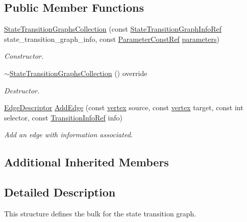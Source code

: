 \subsection*{Public Member Functions}
\begin{DoxyCompactItemize}
\item 
\hyperlink{classStateTransitionGraphsCollection_a1103b1504905684e153f0a746f8d85be}{State\+Transition\+Graphs\+Collection} (const \hyperlink{state__transition__graph_8hpp_ad14dd7263de4e0bad3ad431954ad8252}{State\+Transition\+Graph\+Info\+Ref} state\+\_\+transition\+\_\+graph\+\_\+info, const \hyperlink{Parameter_8hpp_a37841774a6fcb479b597fdf8955eb4ea}{Parameter\+Const\+Ref} \hyperlink{structgraphs__collection_adfc2ecaf0a04245a3cfd572c213ef1ed}{parameters})
\begin{DoxyCompactList}\small\item\em Constructor. \end{DoxyCompactList}\item 
\hyperlink{classStateTransitionGraphsCollection_afabde2a96d4934b3f6d251b65855645e}{$\sim$\+State\+Transition\+Graphs\+Collection} () override
\begin{DoxyCompactList}\small\item\em Destructor. \end{DoxyCompactList}\item 
\hyperlink{graph_8hpp_a9eb9afea34e09f484b21f2efd263dd48}{Edge\+Descriptor} \hyperlink{classStateTransitionGraphsCollection_a4d98b8de9e68a68d75e9c2528a3b1444}{Add\+Edge} (const \hyperlink{graph_8hpp_abefdcf0544e601805af44eca032cca14}{vertex} source, const \hyperlink{graph_8hpp_abefdcf0544e601805af44eca032cca14}{vertex} target, const int selector, const \hyperlink{state__transition__graph_8hpp_a4406374514e349d48b6dd148b6977b53}{Transition\+Info\+Ref} info)
\begin{DoxyCompactList}\small\item\em Add an edge with information associated. \end{DoxyCompactList}\end{DoxyCompactItemize}
\subsection*{Additional Inherited Members}


\subsection{Detailed Description}
This structure defines the bulk for the state transition graph. 

